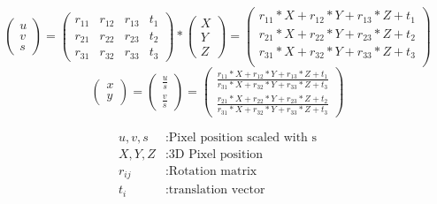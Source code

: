 \documentclass[11pt,a4paper,titlepage,oneside]{report}
\begin{document}
\begin{equation}\label{eq:pe_warped}
	\begin{pmatrix}
		u \\
		v \\
		s
	\end{pmatrix}=
	\begin{pmatrix}
		r_{11} & r_{12} & r_{13} & t_{1} \\
		r_{21} & r_{22} & r_{23} & t_{2} \\
		r_{31} & r_{32} & r_{33} & t_{3}
	\end{pmatrix}*
	\begin{pmatrix}
		X\\
		Y\\
		Z
	\end{pmatrix}=
	\begin{pmatrix}
		r_{11}*X + r_{12}*Y + r_{13}*Z + t_{1} \\
		r_{21}*X + r_{22}*Y + r_{23}*Z + t_{2} \\
		r_{31}*X + r_{32}*Y + r_{33}*Z + t_{3} \\
	\end{pmatrix}
\end{equation}
\begin{equation}
	\begin{pmatrix}
		x \\
		y 
	\end{pmatrix}=
	\begin{pmatrix}
		\frac{u}{s} \\
		\frac{v}{s} 
	\end{pmatrix}=
	\begin{pmatrix}
		\frac{r_{11}*X + r_{12}*Y + r_{13}*Z + t_{1}}{r_{31}*X + r_{32}*Y + r_{33}*Z + t_{3}}  \\
		\frac{r_{21}*X + r_{22}*Y + r_{23}*Z + t_{2}}{r_{31}*X + r_{32}*Y + r_{33}*Z + t_{3}}
	\end{pmatrix}
\end{equation}

\begin{align*}
	u,v,s			&:	\text{Pixel position scaled with s}\\
	X,Y,Z			&:	\text{3D Pixel position}\\
	r_{ij}		&:	\text{Rotation matrix}\\
	t_{i}			&:	\text{translation vector}\\
\end{align*}
\end{document}
